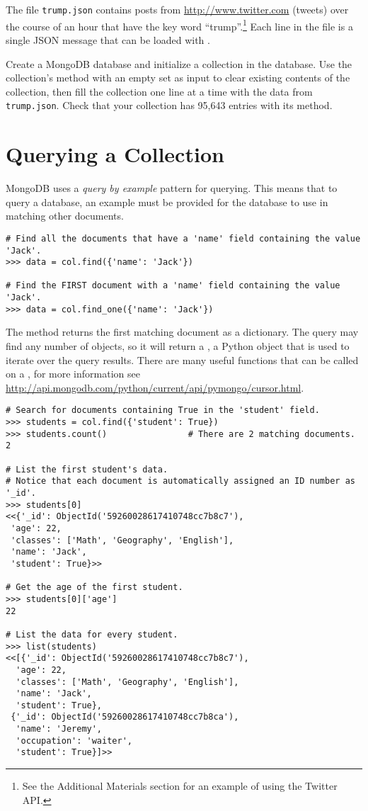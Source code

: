 \begin{problem} %
The file \texttt{trump.json} contains posts from \url{http://www.twitter.com} (tweets) over the course of an hour that have the key word ``trump''.\footnote{See the Additional Materials section for an example of using the Twitter API.}
Each line in the file is a single JSON message that can be loaded with .

Create a MongoDB database and initialize a collection in the database.
Use the collection's  method with an empty set as input to clear existing contents of the collection, then fill the collection one line at a time with the data from \texttt{trump.json}.
Check that your collection has 95,643 entries with its  method.
\label{prob:mongo-fill-db}
\end{problem}

\section*{Querying a Collection} %

MongoDB uses a \emph{query by example} pattern for querying.  This means that to query a database, an example must be provided for the database to use in matching other documents.
\begin{lstlisting}
# Find all the documents that have a 'name' field containing the value 'Jack'.
>>> data = col.find({'name': 'Jack'})

# Find the FIRST document with a 'name' field containing the value 'Jack'.
>>> data = col.find_one({'name': 'Jack'})
\end{lstlisting}

The  method returns the first matching document as a dictionary.
The  query may find any number of objects, so it will return a , a Python object that is used to iterate over the query results.
There are many useful functions that can be called on a , for more information see \url{http://api.mongodb.com/python/current/api/pymongo/cursor.html}.

\begin{lstlisting}
# Search for documents containing True in the 'student' field.
>>> students = col.find({'student': True})
>>> students.count()                # There are 2 matching documents.
2

# List the first student's data.
# Notice that each document is automatically assigned an ID number as '_id'.
>>> students[0]
<<{'_id': ObjectId('59260028617410748cc7b8c7'),
 'age': 22,
 'classes': ['Math', 'Geography', 'English'],
 'name': 'Jack',
 'student': True}>>

# Get the age of the first student.
>>> students[0]['age']
22

# List the data for every student.
>>> list(students)
<<[{'_id': ObjectId('59260028617410748cc7b8c7'),
  'age': 22,
  'classes': ['Math', 'Geography', 'English'],
  'name': 'Jack',
  'student': True},
 {'_id': ObjectId('59260028617410748cc7b8ca'),
  'name': 'Jeremy',
  'occupation': 'waiter',
  'student': True}]>>
\end{lstlisting}

